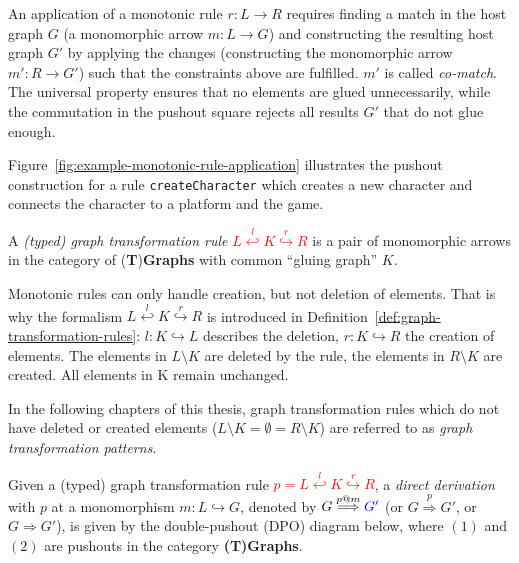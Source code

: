 \noindent
An application of a monotonic rule $r: L \rightarrow R$ requires finding a match in the host graph $G$ (\ie a monomorphic arrow $m: L \rightarrow G$) 
and constructing the resulting host graph $G'$ by applying the changes (\ie constructing the monomorphic arrow $m': R \rightarrow G'$) such that the constraints above are fulfilled.
$m'$ is called \emph{co-match}.
The universal property ensures that no elements are glued unnecessarily, while the commutation in the pushout square rejects all results $G'$ that do not glue enough.

Figure~\ref{fig:example-monotonic-rule-application} illustrates the pushout construction for a rule \texttt{createCharacter} which creates a new character and connects the character to a platform and the game.

\begin{definition}
	\label{def:graph-transformation-rules}%
	A \emph{(typed) graph transformation rule} \textcolor{red}{$L \stackrel{l}{\hookleftarrow} K \stackrel{r}{\hookrightarrow} R$} is a pair of monomorphic arrows in the category of (\textbf{T})\textbf{Graphs} with common ``gluing graph'' $K$. 
\end{definition}

\noindent
Monotonic rules can only handle creation, but not deletion of elements.
That is why the formalism $L \stackrel{l}{\hookleftarrow} K \stackrel{r}{\hookrightarrow} R$ is introduced in Definition~\ref{def:graph-transformation-rules}:
$l: K \hookrightarrow L$ describes the deletion, $r: K \hookrightarrow R$ the creation of elements.
The elements in $L \setminus K$ are deleted by the rule, the elements in $R \setminus K$ are created.
All elements in K remain unchanged.

In the following chapters of this thesis, graph transformation rules which do not have deleted or created elements (\ie $L \setminus K = \emptyset = R \setminus K$) are referred to as \textit{graph transformation patterns}.

\begin{definition}
	\label{def:dpo-rule-application}%
	Given a (typed) graph transformation rule \textcolor{red}{$p = L \stackrel{l}{\hookleftarrow} K \stackrel{r}{\hookrightarrow} R$}, a \emph{direct derivation} with $p$ at a monomorphism $m: L \hookrightarrow G$, denoted by $G\stackrel{p@m}{\Longrightarrow}\textcolor{blue}{G'}$ (or $G\stackrel{p}{\Rightarrow}G'$, or $G \Rightarrow G'$), is given by the double-pushout (DPO) diagram below, where $(1)$ and $(2)$ are pushouts in the category \textbf{(T)Graphs}. 
\end{definition}

